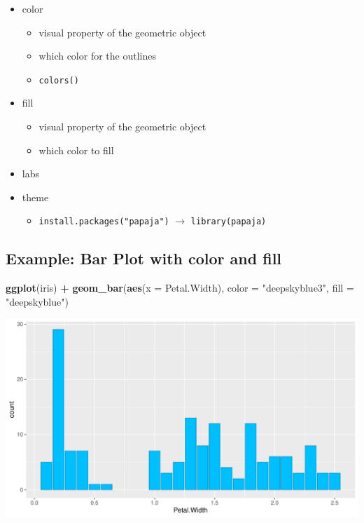 \documentclass[
]{book}
\newenvironment{Shaded}{\begin{snugshade}}{\end{snugshade}}
\newcommand{\AttributeTok}[1]{\textcolor[rgb]{0.13,0.29,0.53}{#1}}
\newcommand{\FunctionTok}[1]{\textcolor[rgb]{0.13,0.29,0.53}{\textbf{#1}}}
\newcommand{\NormalTok}[1]{#1}
\newcommand{\SpecialCharTok}[1]{\textcolor[rgb]{0.81,0.36,0.00}{\textbf{#1}}}
\newcommand{\StringTok}[1]{\textcolor[rgb]{0.31,0.60,0.02}{#1}}
\providecommand{\tightlist}{%
  \setlength{\itemsep}{0pt}\setlength{\parskip}{0pt}}
\begin{document}
\begin{itemize}
\tightlist
\item
  color

  \begin{itemize}
  \tightlist
  \item
    visual property of the geometric object
  \item
    which color for the outlines
  \item
    \texttt{colors()}
  \end{itemize}
\item
  fill

  \begin{itemize}
  \tightlist
  \item
    visual property of the geometric object
  \item
    which color to fill
  \end{itemize}
\item
  labs
\item
  theme

  \begin{itemize}
  \tightlist
  \item
    \texttt{install.packages("papaja")} \(\rightarrow\) \texttt{library(papaja)}
  \end{itemize}
\end{itemize}

\subsection{Example: Bar Plot with color and fill}\label{example-bar-plot-with-color-and-fill}

\begin{Shaded}
\begin{Highlighting}[]
\FunctionTok{ggplot}\NormalTok{(iris) }\SpecialCharTok{+} 
  \FunctionTok{geom\_bar}\NormalTok{(}\FunctionTok{aes}\NormalTok{(}\AttributeTok{x =}\NormalTok{ Petal.Width), }\AttributeTok{color =} \StringTok{"deepskyblue3"}\NormalTok{, }\AttributeTok{fill =} \StringTok{"deepskyblue"}\NormalTok{)}
\end{Highlighting}
\end{Shaded}

\begin{flushleft}\includegraphics{_main_files/figure-latex/unnamed-chunk-49-1} \end{flushleft}
\end{document}
